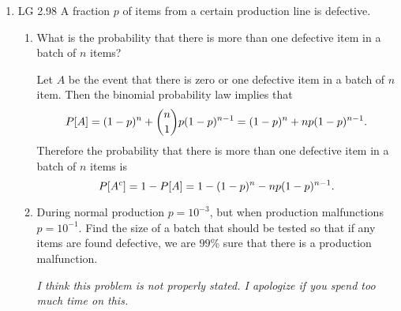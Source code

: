\begin{enumerate}
	\item LG 2.98
	\ifdefined\sol
	A fraction $p$ of items from a certain production line is defective.
	\begin{enumerate}
		\item What is the probability that there is more than one defective
		item in a batch of $n$ items?
		\begin{solution}
			Let $A$ be the event
			that there is zero or one defective item in a batch of $n$ item.
			Then the binomial probability law implies that
			\[
				P[A] = (1-p)^n + {n\choose 1}p(1-p)^{n-1}
				= (1-p)^n + n p(1-p)^{n-1}.
			\]
			Therefore the probability that there is more than one defective
			item in a batch of $n$ items is
			\[
				P[{A}^c] = 1-P[A]
				=1 - (1-p)^n - n p(1-p)^{n-1}.
			\]
		\end{solution}


		\item During normal production $p = 10^{-3}$,
		but when production malfunctions $p = 10^{-1}$.
		Find the size of a batch that should be tested
		so that if any items are found defective,
		we are $99$\% sure that there is a production malfunction.
		\begin{solution}
		\emph{I think this problem is not properly stated.
		I apologize if you spend too much time on this.
		}
		\iffalse
			\[
				1-(1-p)^n \geq 0.99
				\Leftrightarrow
				(1-p)^n \leq 0.01
				\Leftrightarrow
				n \geq \frac{\log0.01}{\log(1-p)}
				= \frac{\log0.01}{\log(0.9)}
				= 43.71,
			\]
			hence
			we should test at least $44$ items.
		\fi

			
		\iffalse
			Let $M$ be the event that there is a production malfunction
			and let $D$ be the event that any items are found defective.
			Let $q$ be the probability that the production operates in normal mode
			and let $p_1 = 10^{-3}$ and $p_2 = 10^{-1}$.
			Then the probability that there is a production malfunctions
			given that any items are found defective is
			\begin{eqnarray*}
				\lefteqn{\cpr{M}{D} = \cpreq{M}{D}
				= \frac{\cpr{D}{M}\pr{M}}{\cpr{D}{M}\pr{M} + \cpr{D}{\comp{M}}\pr{\comp{M}}}
				}
				\\&=& \frac{(1-(1-p_2)^n)(1-q)}
				{ (1-(1-p_2)^n)(1-q) + (1-(1-p_1)^n) q }
				\geq 0.99
			\end{eqnarray*}
		\fi
		\end{solution}
	\end{enumerate}
	\fi


\end{enumerate}
